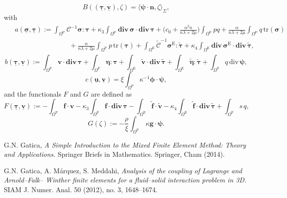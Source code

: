\documentclass[11pt]{article}
\numberwithin{equation}{section}
\def\b{\boldsymbol}
\newcommand\ff{\boldsymbol{f}}
\newcommand\nn{\boldsymbol{n}}
\newcommand\OmP{\Omega^{\mathrm{P}}}
\newcommand\OmE{\Omega^{\mathrm{E}}}
\numberwithin{equation}{section}
\begin{document}
	\begin{equation}
	B((\underline{\b \tau},\underline{\b v}), \zeta) = \langle\b \psi\cdot\nn,\zeta\rangle_{\Sigma},
	\end{equation}
	with
	\begin{align}\label{var-form-A}
	\begin{split}
	& a(\underline{\b \sigma},\underline{\b \tau}):=\int_{\OmP}\mathcal{C}^{-1}\b \sigma\colon\b \tau + \kappa_3\int_{\OmP}\mathbf{div}\, \b \sigma\cdot \mathbf{div}\, \b \tau + \Big(c_0+\frac{\alpha^2n}{n\lambda+2\mu}\Big)\int_{\OmP}p q + \frac{\alpha}{n\lambda+2\mu} \int_{\OmP} q\,\mathrm{tr}(\b \sigma)\\
	&\qquad \qquad\qquad \qquad + \frac{\alpha}{n\lambda+2\mu} \int_{\OmP} p\,\mathrm{tr}(\b \tau) +   \int_{\OmE}\widetilde{\mathcal{C}}^{-1}\b \sigma^{\mathrm{E}}\colon\widetilde{\b \tau} + \kappa_4\int_{\OmE}\mathbf{div}\, \b \sigma^{\mathrm{E}}\cdot \mathbf{div}\, \widetilde{\b \tau},
	\end{split}
	\end{align} 
	\begin{equation}\label{var-form-b}
	b(\underline{\b \tau}, \underline{\b v}):=  \int_{\OmP} \b v \cdot\mathbf{div}\,\b \tau + \int_{\OmP} \b \eta \colon\b \tau+ \int_{\OmE} \widetilde{\b v} \cdot\mathbf{div}\,\widetilde{\b \tau} + \int_{\OmE} \widetilde{\b \eta} \colon\widetilde{\b \tau} + \int_{\OmP} q \,\mathrm{div}\,\b \psi,
	\end{equation}
	\begin{equation}\label{var-form-c}
	c(\underline{\b u},\underline{\b v}) =  \xi\int_{\OmP}\kappa^{-1}\b \phi \cdot\b \psi,
	\end{equation}
	and the functionals $F$ and $G$ are defined as
	\begin{equation}\label{funct-F}
	F(\underline{\b \tau},\underline{\b v}) := -\int_{\OmP} \ff\cdot \b v-\kappa_3\int_{\OmP} \ff\cdot \mathbf{div}\,\b \tau -\int_{\OmE} \widetilde{\ff}\cdot \widetilde{\b v}-\kappa_4\int_{\OmE} \widetilde{\ff}\cdot \mathbf{div}\,\widetilde{\b \tau} + \int_{\OmP}s\,q,
	\end{equation}
	\begin{equation}\label{funct-G}
	G(\zeta) :=  - \frac{\rho}{\xi}\int_{\OmP}\,\kappa\boldsymbol{g}\cdot \b \psi.
	\end{equation}
	\begin{thebibliography}{99}
		\small
		{\sc G.N. Gatica}, {\it A Simple Introduction to the Mixed Finite Element Method: Theory and Applications.} Springer Briefs in
		Mathematics. Springer, Cham (2014).
		
		{\sc G.N. Gatica,  A. M\'arquez, S. Meddahi}, {\it Analysis of the coupling of Lagrange and Arnold--Falk--
			Winther finite elements for a fluid--solid interaction problem in 3D.} SIAM J. Numer. Anal. 50 (2012), no. 3, 1648--1674.	
		
	\end{thebibliography}
\end{document}
